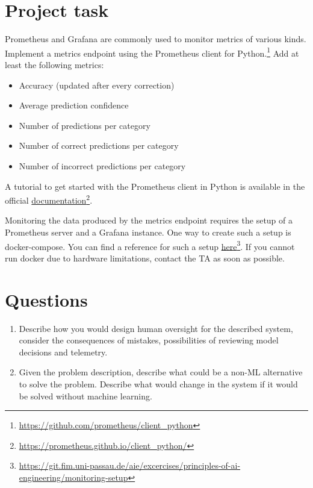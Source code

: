 

\newcommand{\dozenten}{Prof.~Dr.~Steffen Herbold}
\newcommand{\vorlesung}{Principles of AI Engineering}
\newcommand{\docauthor}{Lukas Schulte}
\newcommand{\semester}{}
\newcommand{\blattnummer}{9}
\newcommand{\bistermin}{}



\section*{Project task}

Prometheus and Grafana are commonly used to monitor metrics of various kinds. Implement a metrics endpoint using the Prometheus client for Python.\footnote{\url{https://github.com/prometheus/client_python}} Add at least the following metrics:

\begin{itemize}
      \item Accuracy (updated after every correction)
      \item Average prediction confidence
      \item Number of predictions per category
      \item Number of correct predictions per category
      \item Number of incorrect predictions per category
\end{itemize}

A tutorial to get started with the Prometheus client in Python is available in the official \href{https://prometheus.github.io/client_python/}{documentation}\footnote{\url{https://prometheus.github.io/client_python/}}.

\vspace{5px}

Monitoring the data produced by the metrics endpoint requires the setup of a Prometheus server and a Grafana instance. One way to create such a setup is docker-compose. You can find a reference for such a setup \href{https://git.fim.uni-passau.de/aie/excercises/principles-of-ai-engineering/monitoring-setup}{here}\footnote{\url{https://git.fim.uni-passau.de/aie/excercises/principles-of-ai-engineering/monitoring-setup}}. If you cannot run docker due to hardware limitations, contact the TA as soon as possible.

\section*{Questions}

\begin{enumerate}
      \item
            Describe how you would design human oversight for the described system, consider the consequences of mistakes, possibilities of reviewing model decisions and telemetry.
      \item
            Given the problem description, describe what could be a non-ML alternative to solve the problem.
            Describe what would change in the system if it would be solved without machine learning.
\end{enumerate}


